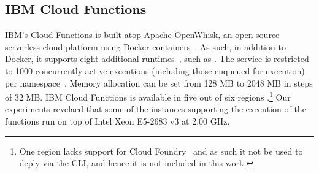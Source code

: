 \begin{table}[!t]

\caption[Google Cloud Functions - Possible memory allocation and corresponding CPU frequency]{Google Cloud Functions - Possible memory allocation and corresponding CPU frequency~\cite{GoogleFunctionsPricing}.}
\centering
{}
\label{table:google_functions_cpu_ram}
\end{table}


\subsection{IBM Cloud Functions}\label{sec:ss:ibm}

\gls{IBM}'s Cloud Functions \cite{IBMFunctions} is built atop Apache OpenWhisk, an open source serverless cloud platform using Docker containers~\cite{OpenWhisk}. 
As such, in addition to Docker, it supports eight additional runtimes~\cite{IBMRuntimes}, such as .
The service is restricted to 1000 concurrently active executions (including those enqueued for execution) per namespace~\cite{IBMLimits}. 
Memory allocation can be set from 128 \gls{MB} to 2048 \gls{MB} in steps of 32 \gls{MB}. 
\gls{IBM} Cloud Functions is available in five out of six regions \cite{IBMLocations}.\footnote{One region lacks support for Cloud Foundry~\cite{IBMCloudFoundry} and as such it not be used to deply via the \gls{CLI}, and hence it is not included in this work.} 
Our experiments revelaed that some of the  instances supporting the execution of the functions run on top of Intel Xeon E5-2683 v3 at 2.00 \gls{GHz}.

